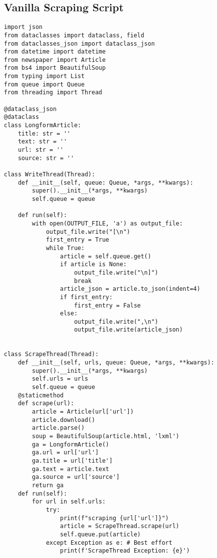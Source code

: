 \subsection{Vanilla Scraping Script}
\begin{verbatim}
import json
from dataclasses import dataclass, field
from dataclasses_json import dataclass_json
from datetime import datetime
from newspaper import Article
from bs4 import BeautifulSoup
from typing import List
from queue import Queue
from threading import Thread

@dataclass_json
@dataclass
class LongformArticle:
    title: str = ''
    text: str = ''
    url: str = ''
    source: str = ''

class WriteThread(Thread):
    def __init__(self, queue: Queue, *args, **kwargs):
        super().__init__(*args, **kwargs)
        self.queue = queue

    def run(self):
        with open(OUTPUT_FILE, 'a') as output_file:
            output_file.write("[\n")
            first_entry = True
            while True:
                article = self.queue.get()
                if article is None:
                    output_file.write("\n]")
                    break
                article_json = article.to_json(indent=4)
                if first_entry:
                    first_entry = False
                else:
                    output_file.write(",\n")
                    output_file.write(article_json)


class ScrapeThread(Thread):
    def __init__(self, urls, queue: Queue, *args, **kwargs):
        super().__init__(*args, **kwargs)
        self.urls = urls
        self.queue = queue
    @staticmethod
    def scrape(url):
        article = Article(url['url'])
        article.download()
        article.parse()
        soup = BeautifulSoup(article.html, 'lxml')
        ga = LongformArticle()
        ga.url = url['url']
        ga.title = url['title']
        ga.text = article.text
        ga.source = url['source']
        return ga
    def run(self):
        for url in self.urls: 
            try:
                print(f"scraping {url['url']}")
                article = ScrapeThread.scrape(url)
                self.queue.put(article)
            except Exception as e: # Best effort
                print(f'ScrapeThread Exception: {e}')
\end{verbatim}